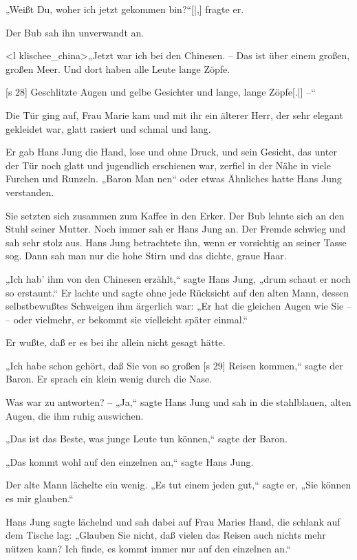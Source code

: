„Weißt Du, woher ich jetzt gekommen bin?“[|,]
fragte er.

Der Bub sah ihn unverwandt an.

<l klischee_china>„Jetzt war ich bei den Chinesen. – Das ist
über einem großen, großen Meer. Und dort haben
alle Leute lange Zöpfe.

[s 28]
Geschlitzte Augen und gelbe Gesichter und lange,
lange Zöp­fe[.|] –“

Die Tür ging auf, Frau Marie kam und mit
ihr ein älterer Herr, der sehr elegant gekleidet war,
glatt rasiert und schmal und lang.

Er gab Hans Jung die Hand, lose und ohne
Druck, und sein Gesicht, das unter der Tür noch
glatt und jugendlich erschienen war, zerfiel in der
Nähe in viele Furchen und Runzeln. „Baron Man­
nen“ oder etwas Ähnliches hatte Hans Jung verstanden.

Sie setzten sich zusammen zum Kaffee in den
Erker. Der Bub lehnte sich an den Stuhl seiner
Mutter. Noch immer sah er Hans Jung an. Der
Fremde schwieg und sah sehr stolz aus. Hans Jung
betrachtete ihn, wenn er vorsichtig an seiner Tasse
sog. Dann sah man nur die hohe Stirn und das
dichte, graue Haar.

„Ich hab' ihm von den Chinesen erzählt,“ sagte
Hans Jung, „drum schaut er noch so erstaunt.“ Er
lachte und sagte ohne jede Rücksicht auf den alten
Mann, dessen selbstbewußtes Schweigen ihm ärgerlich
war: „Er hat die gleichen Augen wie Sie – –
oder vielmehr, er bekommt sie vielleicht später einmal.“

Er wußte, daß er es bei ihr allein nicht gesagt
hätte.

„Ich habe schon gehört, daß Sie von so großen
[s 29]
Reisen kommen,“ sagte der Baron. Er sprach ein
klein wenig durch die Nase.

Was war zu antworten? – „Ja,“ sagte Hans
Jung und sah in die stahlblauen, alten Augen, die
ihm ruhig auswichen.

„Das ist das Beste, was junge Leute tun können,“
sagte der Baron.

„Das kommt wohl auf den einzelnen an,“ sagte
Hans Jung.

Der alte Mann lächelte ein wenig. „Es tut
einem jeden gut,“ sagte er, „Sie können es mir
glauben.“

Hans Jung sagte lächelnd und sah dabei auf Frau
Maries Hand, die schlank auf dem Tische lag:
„Glauben Sie nicht, daß vielen das Reisen auch nichts
mehr nützen kann? Ich finde, es kommt immer nur
auf den einzelnen an.“

